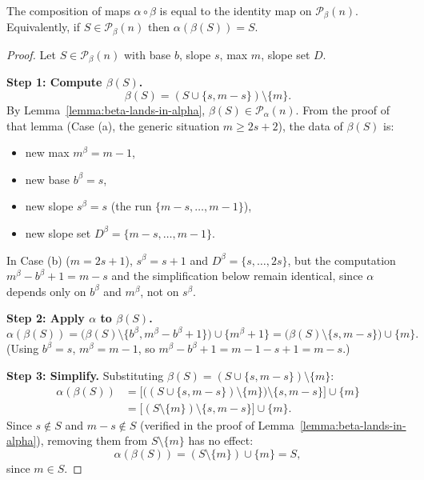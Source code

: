 \begin{lemma}\label{lemma:alpha-after-beta}\leanok
  The composition of maps $\alpha\circ\beta$ is equal to the identity map on  $\mathcal{P}_\beta(n)$. Equivalently, if $S\in \mathcal{P}_\beta(n)$ then $\alpha(\beta(S))=S$.
\end{lemma}
\begin{proof}\leanok
Let $S \in \mathcal{P}_\beta(n)$ with base $b$, slope $s$, max $m$, slope set $D$.

\textbf{Step 1: Compute $\beta(S)$.}
$$\beta(S) = (S \cup \{s, m - s\}) \setminus \{m\}.$$
By Lemma~\ref{lemma:beta-lands-in-alpha}, $\beta(S) \in \mathcal{P}_\alpha(n)$. From the proof of that lemma (Case (a), the generic situation $m \geq 2s + 2$), the data of $\beta(S)$ is:
\begin{itemize}
\item new max $m^\beta = m - 1$,
\item new base $b^\beta = s$,
\item new slope $s^\beta = s$ (the run $\{m - s, \ldots, m - 1\}$),
\item new slope set $D^\beta = \{m - s, \ldots, m - 1\}$.
\end{itemize}
In Case (b) ($m = 2s + 1$), $s^\beta = s + 1$ and $D^\beta = \{s, \ldots, 2s\}$, but the computation $m^\beta - b^\beta + 1 = m - s$ and the simplification below remain identical, since $\alpha$ depends only on $b^\beta$ and $m^\beta$, not on $s^\beta$.

\textbf{Step 2: Apply $\alpha$ to $\beta(S)$.}
$$\alpha(\beta(S)) = \bigl(\beta(S) \setminus \{b^\beta, m^\beta - b^\beta + 1\}\bigr) \cup \{m^\beta + 1\} = \bigl(\beta(S) \setminus \{s, m - s\}\bigr) \cup \{m\}.$$
(Using $b^\beta = s$, $m^\beta = m - 1$, so $m^\beta - b^\beta + 1 = m - 1 - s + 1 = m - s$.)

\textbf{Step 3: Simplify.}
Substituting $\beta(S) = (S \cup \{s, m - s\}) \setminus \{m\}$:
\begin{align*}
\alpha(\beta(S))
&= \bigl[\bigl((S \cup \{s, m - s\}) \setminus \{m\}\bigr) \setminus \{s, m - s\}\bigr] \cup \{m\} \\
&= \bigl[(S \setminus \{m\}) \setminus \{s, m - s\}\bigr] \cup \{m\}.
\end{align*}
Since $s \notin S$ and $m - s \notin S$ (verified in the proof of Lemma~\ref{lemma:beta-lands-in-alpha}), removing them from $S \setminus \{m\}$ has no effect:
$$\alpha(\beta(S)) = (S \setminus \{m\}) \cup \{m\} = S,$$
since $m \in S$.
\end{proof}

